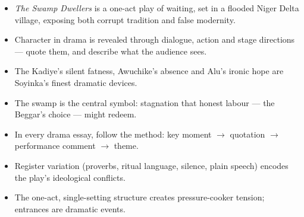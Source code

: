 \documentclass[11pt]{article}
\newcommand{\cle}[1]{{\popxbold\color{popdark}#1}}
\begin{document}
\begin{aretenir}
\begin{itemize}
\item \emph{The Swamp Dwellers} is a one-act play of waiting, set in a flooded Niger Delta village, exposing both corrupt tradition and false modernity.
\item Character in drama is revealed through \cle{dialogue}, \cle{action} and \cle{stage directions} — quote them, and describe what the audience sees.
\item The Kadiye's silent fatness, Awuchike's absence and Alu's ironic hope are Soyinka's finest dramatic devices.
\item The swamp is the central symbol: stagnation that honest labour — the Beggar's choice — might redeem.
\item In every drama essay, follow the method: key moment $\rightarrow$ quotation $\rightarrow$ performance comment $\rightarrow$ theme.
\item Register variation (proverbs, ritual language, silence, plain speech) encodes the play's ideological conflicts.
\item The one-act, single-setting structure creates pressure-cooker tension; entrances are dramatic events.
\end{itemize}
\end{aretenir}
\end{document}
